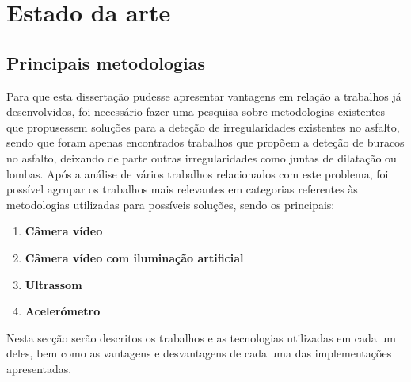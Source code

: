 \chapter{Estado da arte}
\label{cha:estado_da_arte}

\section{Principais metodologias} %
\label{sec:principais_metodologias}

Para que esta dissertação pudesse apresentar vantagens em relação a trabalhos já desenvolvidos, foi necessário fazer uma pesquisa sobre metodologias existentes que propusessem soluções para a deteção de irregularidades existentes no asfalto, sendo que foram apenas encontrados trabalhos que propõem a deteção de buracos no asfalto, deixando de parte outras irregularidades como juntas de dilatação ou lombas. 
Após a análise de vários trabalhos relacionados com este problema, foi possível agrupar os trabalhos mais relevantes em categorias referentes às metodologias utilizadas para possíveis soluções, sendo os principais:
\begin{enumerate}
	\item \textbf{Câmera vídeo}
	\item \textbf{Câmera vídeo com iluminação artificial}
	\item \textbf{Ultrassom}
	\item \textbf{Acelerómetro}
\end{enumerate}
Nesta secção serão descritos os trabalhos e as tecnologias utilizadas em cada um deles, bem como as vantagens e desvantagens de cada uma das implementações apresentadas.

